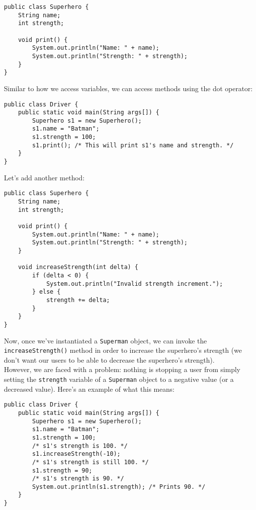 \begin{lstlisting}
public class Superhero {
    String name;
    int strength;
    
    void print() {
        System.out.println("Name: " + name);
        System.out.println("Strength: " + strength);
    }
}
\end{lstlisting}

Similar to how we access variables, we can access methods using the dot operator:

\begin{lstlisting}
public class Driver {
    public static void main(String args[]) {
        Superhero s1 = new Superhero();
        s1.name = "Batman";
        s1.strength = 100;
        s1.print(); /* This will print s1's name and strength. */
    }
}
\end{lstlisting}


Let's add another method:


\begin{lstlisting}
public class Superhero {
    String name;
    int strength;
    
    void print() {
        System.out.println("Name: " + name);
        System.out.println("Strength: " + strength);
    }
    
    void increaseStrength(int delta) {
        if (delta < 0) {
            System.out.println("Invalid strength increment.");
        } else {
            strength += delta;
        }
    }
}
\end{lstlisting}


Now, once we've instantiated a \verb!Superman! object, we can invoke the \verb!increaseStrength()! method in order to increase the superhero's strength (we don't want our users to be able to decrease the superhero's strength). \\


However, we are faced with a problem: nothing is stopping a user from simply setting the \verb!strength! variable of a \verb!Superman! object to a negative value (or a decreased value). Here's an example of what this means:


\begin{lstlisting}
public class Driver {
    public static void main(String args[]) {
        Superhero s1 = new Superhero();
        s1.name = "Batman";
        s1.strength = 100;
        /* s1's strength is 100. */
        s1.increaseStrength(-10);
        /* s1's strength is still 100. */
        s1.strength = 90; 
        /* s1's strength is 90. */
        System.out.println(s1.strength); /* Prints 90. */
    }
}
\end{lstlisting}

